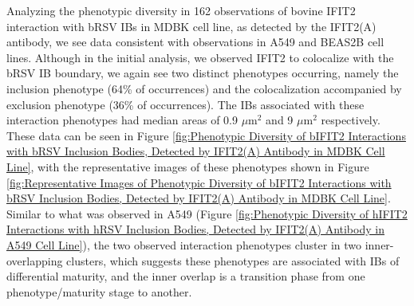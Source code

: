 Analyzing the phenotypic diversity in 162 observations of bovine IFIT2 interaction with bRSV IBs in MDBK cell line, as detected by the IFIT2(A) antibody, we see data consistent with observations in A549 and BEAS2B cell lines. Although in the initial analysis, we observed IFIT2 to colocalize with the bRSV IB boundary, we again see two distinct phenotypes occurring, namely the inclusion phenotype (64\% of occurrences) and the colocalization accompanied by exclusion phenotype (36\% of occurrences). The IBs associated with these interaction phenotypes had median areas of 0.9 \(\mu \mbox{m}^2\) and 9 \(\mu \mbox{m}^2\) respectively. These data can be seen in Figure \ref{fig:Phenotypic Diversity of bIFIT2 Interactions with bRSV Inclusion Bodies, Detected by IFIT2(A) Antibody in MDBK Cell Line}, with the representative images of these phenotypes shown in Figure \ref{fig:Representative Images of Phenotypic Diversity of bIFIT2 Interactions with bRSV Inclusion Bodies, Detected by IFIT2(A) Antibody in MDBK Cell Line}. Similar to what was observed in A549 (Figure \ref{fig:Phenotypic Diversity of hIFIT2 Interactions with hRSV Inclusion Bodies, Detected by IFIT2(A) Antibody in A549 Cell Line}), the two observed interaction phenotypes cluster in two inner-overlapping clusters, which suggests these phenotypes are associated with IBs of differential maturity, and the inner overlap is a transition phase from one phenotype/maturity stage to another.

